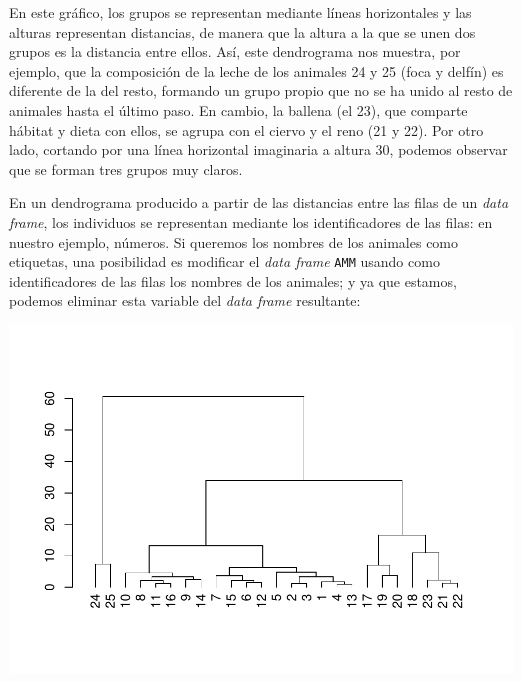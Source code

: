 \documentclass[
]{book}
\newenvironment{Shaded}{\begin{snugshade}}{\end{snugshade}}
\newcommand{\CommentTok}[1]{\textcolor[rgb]{0.56,0.35,0.01}{\textit{#1}}}
\newcommand{\DecValTok}[1]{\textcolor[rgb]{0.00,0.00,0.81}{#1}}
\newcommand{\KeywordTok}[1]{\textcolor[rgb]{0.13,0.29,0.53}{\textbf{#1}}}
\newcommand{\NormalTok}[1]{#1}
\newcommand{\OperatorTok}[1]{\textcolor[rgb]{0.81,0.36,0.00}{\textbf{#1}}}
\theoremstyle{definition}
\theoremstyle{definition}
\theoremstyle{definition}
\theoremstyle{remark}
\begin{document}
En este gráfico, los grupos se representan mediante líneas horizontales y las alturas representan distancias, de manera que la altura a la que se unen dos grupos es la distancia entre ellos. Así, este dendrograma nos muestra, por ejemplo, que la composición de la leche de los animales 24 y 25 (foca y delfín) es diferente de la del resto, formando un grupo propio que no se ha unido al resto de animales hasta el último paso. En cambio, la ballena (el 23), que comparte hábitat y dieta con ellos, se agrupa con el ciervo y el reno (21 y 22).
Por otro lado, cortando por una línea horizontal imaginaria a altura 30, podemos observar que se forman tres grupos muy claros.

En un dendrograma producido a partir de las distancias entre las filas de un \emph{data frame}, los individuos se representan mediante los identificadores de las filas: en nuestro ejemplo, números. Si queremos los nombres de los animales como etiquetas, una posibilidad es modificar el \emph{data frame} \texttt{AMM} usando como identificadores de las filas los nombres de los animales; y ya que estamos, podemos eliminar esta variable del \emph{data frame} resultante:

\begin{Shaded}
\end{Shaded}

\begin{center}\includegraphics[width=0.9\linewidth]{14cap13_EDextra_files/figure-latex/unnamed-chunk-22-1} \end{center}
\end{document}
